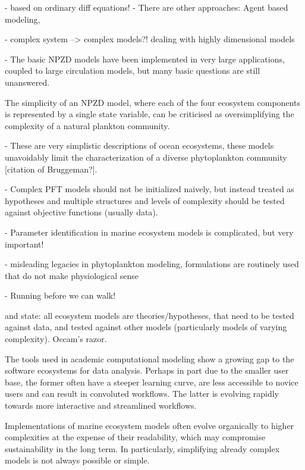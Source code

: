 \documentclass[journal abbreviation, manuscript]{copernicus}
\begin{document}
- based on ordinary diff equations!
- There are other approaches: Agent based modeling, 

- complex system --> complex models?! dealing with highly dimensional models \citep{Dutkiewicz2020DimensionsDiversity}

- The basic NPZD models have been implemented in very large applications, coupled to large circulation models, but many basic questions are still unanswered.


The simplicity of an NPZD model, where each of the four ecosystem components is represented by a single state variable, can be criticised as oversimplifying the complexity of a natural plankton community.

- These are very simplistic descriptions of ocean ecosystems, these models unavoidably limit the characterization of a diverse phytoplankton community [citation of Bruggeman?]. 

- Complex PFT models should not be initialized naively, but instead treated as hypotheses and multiple structures and levels of complexity should be tested against objective functions (usually data). \citep{Franks2009}

- Parameter identification in marine ecosystem models is complicated, but very important! \citep{Schartau2017}

- misleading legacies in phytoplankton modeling, formulations are routinely used that do not make physiological sense \citep{Smith2014}

- Running before we can walk! \citep{Anderson2005}

and state: all ecosystem models are theories/hypotheses, that need to be tested against data, and tested against other models (particularly models of varying complexity). Occam's razor. 



The tools used in academic computational modeling show a growing gap to the software ecosystems for data analysis. Perhaps in part due to the smaller user base, the former often have a steeper learning curve, are less accessible to novice users and can result in convoluted workflows. The latter is evolving rapidly towards more interactive and streamlined workflows.

Implementations of marine ecosystem models often evolve organically to higher complexities at the expense of their readability, which may compromise sustainability in the long term. In particularly, simplifying already complex models is not always possible or simple.
\end{document}
